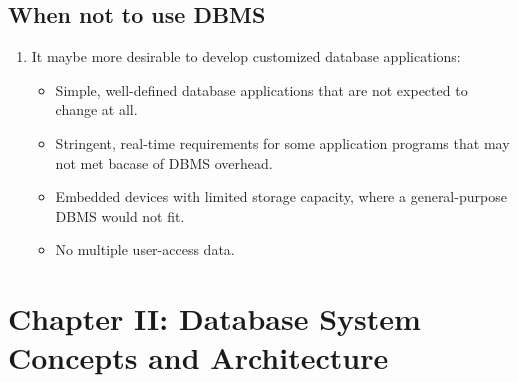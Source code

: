 \documentclass[10pt]{article}
\begin{document}
\subsection{When not to use DBMS}
\begin{enumerate}
	\item It maybe more desirable to develop customized database applications:
	\begin{itemize}
		\item Simple, well-defined database applications that are not expected to change at all.
		\item Stringent, real-time requirements for some application programs that may not met bacase of DBMS overhead.
		\item Embedded devices with limited storage capacity, where a general-purpose DBMS would not fit.
		\item No multiple user-access data.
	\end{itemize}
\end{enumerate}

\bigbreak
\section{Chapter II: Database System Concepts and Architecture}
\end{document}
